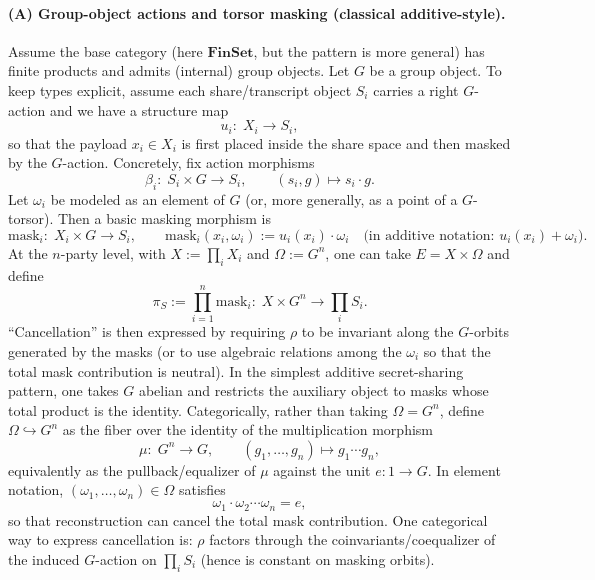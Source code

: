 \documentclass[11pt,a4paper]{article}
\theoremstyle{definition}
\theoremstyle{plain}
\begin{document}
\paragraph{(A) Group-object actions and torsor masking (classical additive-style).}
Assume the base category (here $\mathbf{FinSet}$, but the pattern is more general) has finite products and admits (internal) group objects.
Let $G$ be a group object.
To keep types explicit, assume each share/transcript object $S_i$ carries a right $G$-action and we have a structure map
\[
u_i:\; X_i \longrightarrow S_i,
\]
so that the payload $x_i\in X_i$ is first placed inside the share space and then masked by the $G$-action.
Concretely, fix action morphisms
\[
\beta_i:\; S_i\times G \longrightarrow S_i,
\qquad
(s_i,g)\longmapsto s_i\cdot g.
\]
Let $\omega_i$ be modeled as an element of $G$ (or, more generally, as a point of a $G$-torsor).
Then a basic masking morphism is
\[
\mathrm{mask}_i:\; X_i\times G \longrightarrow S_i,
\qquad
\mathrm{mask}_i(x_i,\omega_i):=u_i(x_i)\cdot \omega_i
\quad\text{(in additive notation: }u_i(x_i)+\omega_i\text{)}.
\]
At the $n$-party level, with $X:=\prod_i X_i$ and $\Omega:=G^n$, one can take $E=X\times \Omega$ and define
\[
\pi_S:=\prod_{i=1}^n \mathrm{mask}_i:\; X\times G^n \longrightarrow \prod_i S_i.
\]
``Cancellation'' is then expressed by requiring $\rho$ to be invariant along the $G$-orbits generated by the masks (or to use algebraic relations among the $\omega_i$ so that the total mask contribution is neutral).
In the simplest additive secret-sharing pattern, one takes $G$ abelian and restricts the auxiliary object to masks whose total product is the identity.
Categorically, rather than taking $\Omega=G^n$, define $\Omega\hookrightarrow G^n$ as the fiber over the identity of the multiplication morphism
\[
\mu:\; G^n \longrightarrow G,
\qquad
(g_1,\dots,g_n)\longmapsto g_1\cdots g_n,
\]
equivalently as the pullback/equalizer of $\mu$ against the unit $e:1\to G$.
In element notation, $(\omega_1,\dots,\omega_n)\in\Omega$ satisfies
\[
\omega_1\cdot \omega_2\cdots \omega_n = e,
\]
so that reconstruction can cancel the total mask contribution.
One categorical way to express cancellation is: $\rho$ factors through the coinvariants/coequalizer of the induced $G$-action on $\prod_i S_i$ (hence is constant on masking orbits).
\end{document}
